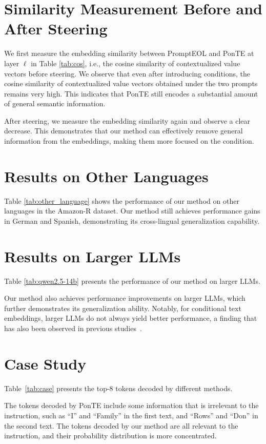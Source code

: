 \documentclass[11pt]{article}
\begin{document}
\section{Similarity Measurement Before and After Steering}
We first measure the embedding similarity between PromptEOL and PonTE at layer $\ell$ in Table \ref{tab:cos}, i.e., the cosine similarity of contextualized value vectors before steering.
We observe that even after introducing conditions, the cosine similarity of contextualized value vectors obtained under the two prompts remains very high.
This indicates that PonTE still encodes a substantial amount of general semantic information.

After steering, we measure the embedding similarity again and observe a clear decrease.
This demonstrates that our method can effectively remove general information from the embeddings, making them more focused on the condition.


\section{Results on Other Languages}
Table \ref{tab:other_language} shows the performance of our method on other languages in the Amazon-R dataset.
Our method still achieves performance gains in German and Spanish, demonstrating its cross-lingual generalization capability.

\section{Results on Larger LLMs}
Table \ref{tab:qwen2.5-14b} presents the performance of our method on larger LLMs.

Our method also achieves performance improvements on larger LLMs, which further demonstrates its generalization ability.
Notably, for conditional text embeddings, larger LLMs do not always yield better performance, a finding that has also been observed in previous studies~\cite{lei2024meta,DBLP:conf/acl/FuCJW0L025}.



\section{Case Study}
Table~\ref{tab:case} presents the top-8 tokens decoded by different methods.

The tokens decoded by PonTE include some information that is irrelevant to the instruction, such as ``I'' and ``Family'' in the first text, and ``Rows'' and ``Don'' in the second text.
The tokens decoded by our method are all relevant to the instruction, and their probability distribution is more concentrated.
\end{document}
